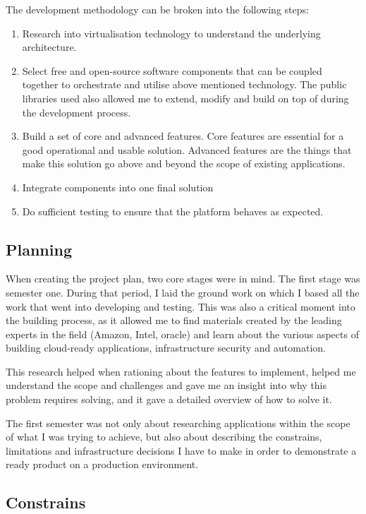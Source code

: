 \documentclass{article}
\begin{document}
	The development methodology can be broken into the following steps:
	\begin{enumerate}
		\item
		Research into virtualisation technology to understand the underlying architecture.
		
		\item
		Select free and open-source software components that can be coupled together to orchestrate and utilise above mentioned technology. The public libraries used also allowed me to extend, modify and build on top of during the development process.
		
		\item
		Build a set of core and advanced features. Core features are essential for a good operational and usable solution. Advanced features are the things that make this solution go above and beyond the scope of existing applications.
		
		\item
		Integrate components into one final solution
		
		\item
		Do sufficient testing to ensure that the platform behaves as expected.
	\end{enumerate}

  \subsection{Planning}
  When creating the project plan, two core stages were in mind. The first stage was semester one. During that period, I laid the ground work on which I based all the work that went into developing and testing. This was also a critical moment into the building process, as it allowed me to find materials created by the leading experts in the field (Amazon, Intel, oracle) and learn about the various aspects of building cloud-ready applications, infrastructure security and automation. 
  
  This research helped when rationing about the features to implement, helped me understand the scope and challenges and gave me an insight into why this problem requires solving, and it gave a detailed overview of how to solve it.
  
  The first semester was not only about researching applications within the scope of what I was trying to achieve, but also about describing the constrains, limitations and infrastructure decisions I have to make in order to demonstrate a ready product on a production environment. 
  \subsection{Constrains}
\end{document}

